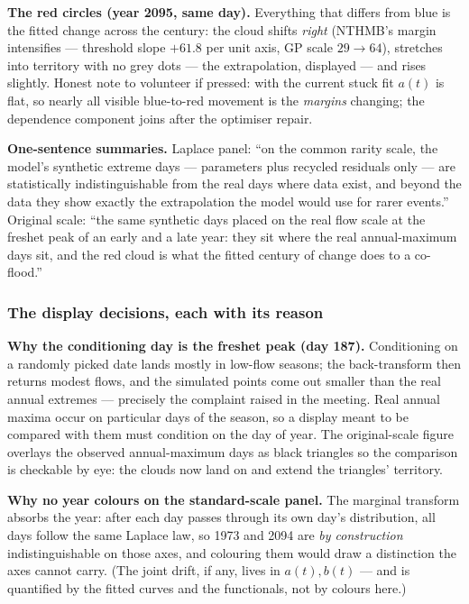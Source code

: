 \documentclass[11pt]{article}
\begin{document}
\textbf{The red circles (year 2095, same day).} Everything that differs
from blue is the fitted change across the century: the cloud shifts
\emph{right} (NTHMB's margin intensifies --- threshold slope $+61.8$ per
unit axis, GP scale $29 \to 64$), stretches into territory with no grey
dots --- the extrapolation, displayed --- and rises slightly. Honest note to
volunteer if pressed: with the current stuck fit $a(t)$ is flat, so nearly
all visible blue-to-red movement is the \emph{margins} changing; the
dependence component joins after the optimiser repair.

\textbf{One-sentence summaries.} Laplace panel: ``on the common rarity
scale, the model's synthetic extreme days --- parameters plus recycled
residuals only --- are statistically indistinguishable from the real days
where data exist, and beyond the data they show exactly the extrapolation
the model would use for rarer events.'' Original scale: ``the same synthetic
days placed on the real flow scale at the freshet peak of an early and a
late year: they sit where the real annual-maximum days sit, and the red
cloud is what the fitted century of change does to a co-flood.''

\subsubsection{The display decisions, each with its reason}

\textbf{Why the conditioning day is the freshet peak (day 187).}
Conditioning on a randomly picked date lands mostly in low-flow seasons; the
back-transform then returns modest flows, and the simulated points come out
smaller than the real annual extremes --- precisely the complaint raised in
the meeting. Real annual maxima occur on particular days of the season, so a
display meant to be compared with them must condition on the day of year.
The original-scale figure overlays the observed annual-maximum days as black
triangles so the comparison is checkable by eye: the clouds now land on and
extend the triangles' territory.

\textbf{Why no year colours on the standard-scale panel.} The marginal
transform absorbs the year: after each day passes through its own day's
distribution, all days follow the same Laplace law, so 1973 and 2094 are
\emph{by construction} indistinguishable on those axes, and colouring them
would draw a distinction the axes cannot carry. (The joint drift, if any,
lives in $a(t), b(t)$ --- and is quantified by the fitted curves and the
functionals, not by colours here.)
\end{document}
